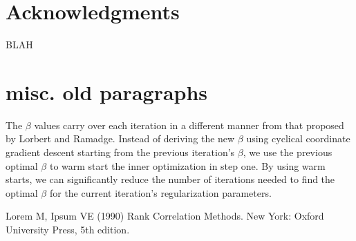 \documentclass[10pt,letterpaper]{article}
\begin{document}
\section*{Acknowledgments}
BLAH

\section*{misc. old paragraphs}


The $\beta$ values carry over each iteration in a different manner from that proposed by Lorbert and Ramadge. Instead of deriving the new $\beta$ using cyclical coordinate gradient descent starting from the previous iteration's $\beta$, we use the previous optimal $\beta$ to warm start the inner optimization in step one. By using warm starts, we can significantly reduce the number of iterations needed to find the optimal $\beta$ for the current iteration's regularization parameters.


%
%
% 
\begin{thebibliography}{10}
Lorem M, Ipsum VE (1990) Rank Correlation Methods. New York: Oxford University Press, 5th edition.

\end{thebibliography}
\end{document}
